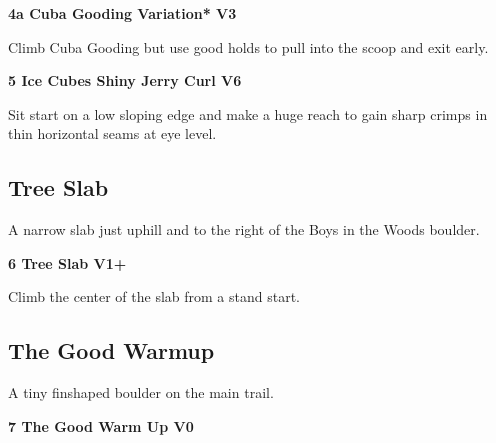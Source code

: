 \begin{multicols}{2}
\begin{adjustwidth}{0.5cm}{}
					\needspace{1.5cm}
\label{vr:Cuba Gooding Variation}
\colorbox{green!20}{
\parbox{0.95\linewidth}{
\textbf{
4a Cuba Gooding Variation* V3  
}}}

					\begin{adjustwidth}{0.5cm}{}			
					Climb Cuba Gooding but use good holds to pull into the scoop and exit early.
					\end{adjustwidth}
					
					
				\end{adjustwidth}
			
			
			\needspace{1.5cm}
\label{rt:Ice Cubes Shiny Jerry Curl}
\colorbox{RoyalBlue!20}{
\parbox{0.95\linewidth}{
\textbf{
5 Ice Cubes Shiny Jerry Curl V6  
}}}

			\begin{adjustwidth}{0.5cm}{}			
			Sit start on a low sloping edge and make a huge reach to gain sharp crimps in thin horizontal seams at eye level.
			\end{adjustwidth}
			
			
		
		
		\needspace{1.5cm}
		\subsection*{Tree Slab}\label{bf:Tree Slab}
		A narrow slab just uphill and to the right of the Boys in the Woods boulder.\\
	
		
			
			\needspace{1.5cm}
\label{rt:Tree Slab}
\colorbox{green!20}{
\parbox{0.95\linewidth}{
\textbf{
6 Tree Slab V1+  
}}}

			\begin{adjustwidth}{0.5cm}{}			
			Climb the center of the slab from a stand start.
			\end{adjustwidth}
			
			
		
		
		\needspace{1.5cm}
		\subsection*{The Good Warmup}\label{bf:The Good Warmup}
		A tiny finshaped boulder on the main trail.\\
	
		
			
			\needspace{1.5cm}
\label{rt:The Good Warm Up}
\colorbox{green!20}{
\parbox{0.95\linewidth}{
\textbf{
7 The Good Warm Up V0  
}}}


\end{multicols}
